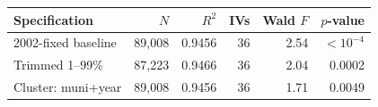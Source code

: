 \begingroup
\centering
\begin{tabular}{lrrrrr}
\toprule
Specification & $N$ & $R^2$ & IVs & Wald $F$ & $p$-value \\
\midrule
2002-fixed baseline & 89,008 & 0.9456 & 36 & 2.54 & $< 10^{-4}$ \\
Trimmed 1--99\% & 87,223 & 0.9466 & 36 & 2.04 & 0.0002 \\
Cluster: muni+year & 89,008 & 0.9456 & 36 & 1.71 & 0.0049 \\
\bottomrule
\end{tabular}
\par\endgroup
